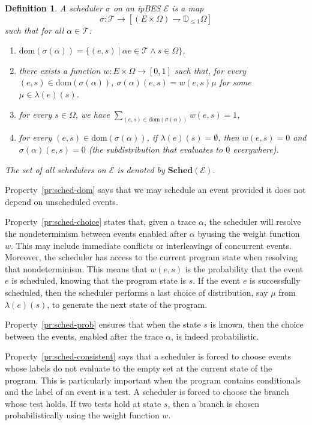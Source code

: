 \documentclass[review]{elsart}
\newtheorem{definition}{Definition}[section]
\newcommand{\Jip}{\mathbb{D}_{\le1}}
\newcommand{\pto}{\rightharpoondown}
\newcommand{\dom}{\mathrm{dom}}
\newcommand{\EE}{\mathcal{E}}
\newcommand{\TT}{\mathcal{T}}
\newcommand{\sched}{\mathbf{Sched}}
\begin{document}
\begin{definition}\label{def:ipscheduler}
A \emph{scheduler} $\sigma$ on an ipBES $\EE$ is a map 
\[
	\sigma{:}\TT{\to} [(E{\times} \Omega){\pto} \Jip\Omega]
\] 
such that for all $\alpha{\in}\TT$:
\begin{enumerate}
\item $\dom(\sigma(\alpha)) = \{(e,s)\ |\ \alpha e{\in}\TT\wedge s{\in}\Omega\}$,\label{pr:sched-dom}
\item there exists a function $w{:}E{\times}\Omega{\to}[0,1]$ such that, for every $(e,s){\in}\dom(\sigma(\alpha))$, $\sigma(\alpha)(e,s) = w(e,s)\mu$ for some $\mu{\in}\lambda(e)(s)$.
\label{pr:sched-choice}
\item for every $ s{\in}\Omega$, we have $\sum_{(e,s){\in}\dom(\sigma(\alpha))} w(e,s) = 1$,\label{pr:sched-prob}
\item for every $(e,s){\in}\dom(\sigma(\alpha))$, if $\lambda(e)(s) {=} \emptyset$, then  $w(e,s) {=} 0$ and $\sigma(\alpha)(e,s) {=} 0$ (the subdistribution that evaluates to $0$ everywhere).\label{pr:sched-consistent}
\end{enumerate}
The set of all schedulers on $\EE$ is denoted by $\sched(\EE)$.
\end{definition}

Property~\ref{pr:sched-dom} says that we may schedule an event provided it does not depend on unscheduled events.

Property~\ref{pr:sched-choice} states that, given a trace $\alpha$, the scheduler will resolve the nondeterminism between events enabled after $\alpha$ byusing the weight function $w$. This may include immediate conflicts or interleavings of concurrent events. Moreover, the scheduler has access to the current program state when resolving that nondeterminism. This means that $w(e,s)$ is the probability that the event $e$ is scheduled, knowing that the program state is $s$. If the event $e$ is successfully scheduled, then the scheduler performs a last choice of distribution, say $\mu$ from $\lambda(e)(s)$, to generate the next state of the program.

Property~\ref{pr:sched-prob} ensures that when the state $s$ is known, then the choice between the events, enabled after the trace $\alpha$, is indeed probabilistic.  

Property~\ref{pr:sched-consistent} says that a scheduler is forced to choose events whose labels do not evaluate to the empty set at the current state of the program. This is particularly important when the program contains conditionals and the label of an event is a test. A scheduler is forced to choose the branch whose test holds. If two tests hold at state $s$, then a branch is chosen probabilistically using the weight function $w$. 
\end{document}
